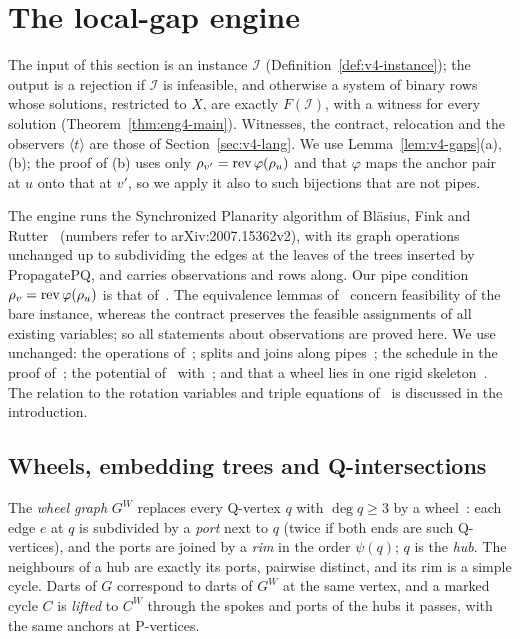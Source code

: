 \section{The local-gap engine}\label{sec:eng4}

\providecommand{\obs}{\operatorname{obs}}
\newcommand{\anout}{c_{\mathrm{out}}}
\newcommand{\anin}{c_{\mathrm{in}}}

The input of this section is an instance $\mathcal I$
(Definition~\ref{def:v4-instance}); the output is a rejection if $\mathcal I$
is infeasible, and otherwise a system of binary rows whose solutions,
restricted to $X$, are exactly $F(\mathcal I)$, with a witness for every
solution (Theorem~\ref{thm:eng4-main}). Witnesses, the contract, relocation
and the observers $\langle t\rangle$ are those of Section~\ref{sec:v4-lang}.
We use Lemma~\ref{lem:v4-gaps}(a),(b); the proof of (b) uses only
$\rho_{v'}=\operatorname{rev}\varphi(\rho_u)$ and that $\varphi$ maps the anchor pair at
$u$ onto that at $v'$, so we apply it also to such bijections that are not
pipes.

The engine runs the Synchronized Planarity algorithm of Bl\"asius, Fink and
Rutter~\cite{BFR21} (numbers refer to arXiv:2007.15362v2), with its graph
operations unchanged up to subdividing the edges at the leaves of the trees
inserted by PropagatePQ, and carries observations and rows along. Our pipe
condition $\rho_v=\operatorname{rev}\varphi(\rho_u)$ is that of~\cite{BFR21}. The
equivalence lemmas of~\cite{BFR21} concern feasibility of the bare instance,
whereas the contract preserves the feasible assignments of all existing
variables; so all statements about observations are proved here. We use
unchanged: the operations of~\cite[Sections~3.1.1--3.4]{BFR21}; splits and
joins along pipes~\cite[Section~2, Lemma~1]{BFR21}; the schedule in the
proof of~\cite[Lemma~7]{BFR21}; the potential of~\cite[Section~3.6]{BFR21} with~\cite[Lemma~9, Lemma~10(i), Lemma~11]{BFR21};
and that a wheel lies in one rigid skeleton~\cite[proof of Lemma~8]{BFR21}.
The relation to the rotation variables and triple equations
of~\cite[Chapter~8]{Pfr22} is discussed in the introduction.

\subsection{Wheels, embedding trees and Q-intersections}\label{sec:eng4-wheels}

The \emph{wheel graph} $G^W$ replaces every Q-vertex $q$ with $\deg q\ge3$
by a wheel~\cite[Section~2]{BFR21}: each edge $e$ at $q$ is subdivided by a
\emph{port} next to $q$ (twice if both ends are such Q-vertices), and the
ports are joined by a \emph{rim} in the order $\psi(q)$; $q$ is the
\emph{hub}. The neighbours of a hub are exactly its ports, pairwise distinct,
and its rim is a simple cycle. Darts of $G$ correspond to darts of $G^W$ at
the same vertex, and a marked cycle $C$ is \emph{lifted} to $C^W$ through the
spokes and ports of the hubs it passes, with the same anchors at P-vertices.

